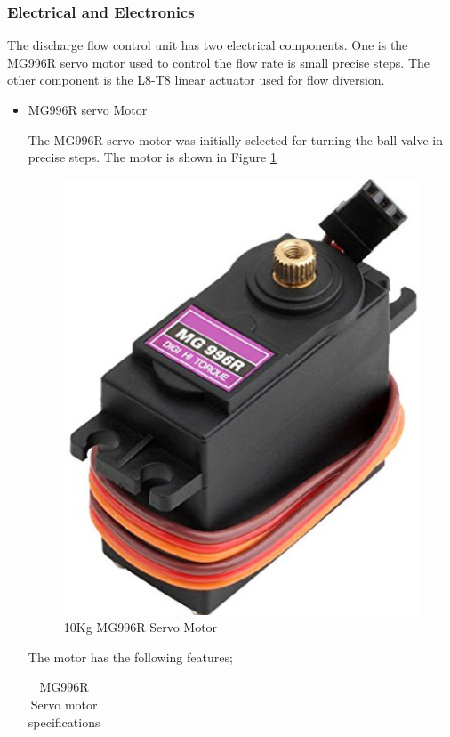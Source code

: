 \subsubsection{Electrical and Electronics}
\par
The discharge flow control unit has two electrical components. One is the MG996R servo motor used to control the flow rate is small precise steps. The other component is the L8-T8 linear actuator used for flow diversion.
\begin{itemize}
    \item MG996R servo Motor
\par
The MG996R servo motor was initially selected for turning the ball valve in precise steps. The motor is shown in  Figure \ref{fig: 10Kg MG996R Servo Motor}
  \begin{figure}[H]
        \centering
        \includegraphics [height=.3\textheight] {Figures/MG996R.jpg}
        \caption{10Kg MG996R Servo Motor}
        \label{fig: 10Kg MG996R Servo Motor}
        \end{figure}
The motor has the following features;
\begin{table}[H]
    \centering
    \caption[MG996R Servo motor specifications]{MG996R Servo motor specifications \cite{mg996r}}
    \begin{tabular}{|l|l|}

\end{tabular}
\end{table}
\end{itemize}

